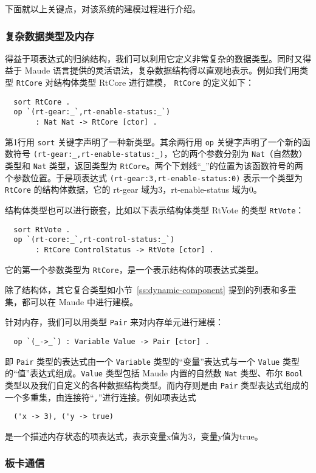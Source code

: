 下面就以上关键点，对该系统的建模过程进行介绍。

\subsubsection{复杂数据类型及内存}

得益于项表达式的归纳结构，我们可以利用它定义非常复杂的数据类型。同时又得益于 Maude 语言提供的灵活语法，复杂数据结构得以直观地表示。例如我们用类型 \verb|RtCore| 对结构体类型 RtCore 进行建模， \verb|RtCore| 的定义如下：
\begin{verbatim}
  sort RtCore .
  op `(rt-gear:_`,rt-enable-status:_`) 
       : Nat Nat -> RtCore [ctor] .
\end{verbatim}
第1行用 \verb|sort| 关键字声明了一种新类型。其余两行用 \verb|op| 关键字声明了一个新的函数符号 \verb|(rt-gear:_,rt-enable-status:_)|，它的两个参数分别为 \verb|Nat|（自然数）类型和 \verb|Nat| 类型，返回类型为 \verb|RtCore|。两个下划线“\verb|_|”的位置为该函数符号的两个参数位置。于是项表达式 \verb|(rt-gear:3,rt-enable-status:0)| 表示一个类型为 \verb|RtCore| 的结构体数据，它的 rt-gear 域为3，rt-enable-status 域为0。

结构体类型也可以进行嵌套，比如以下表示结构体类型 RtVote 的类型 \verb|RtVote|：
\begin{verbatim}
  sort RtVote .
  op `(rt-core:_`,rt-control-status:_`) 
       : RtCore ControlStatus -> RtVote [ctor] .
\end{verbatim}
它的第一个参数类型为 \verb|RtCore|，是一个表示结构体的项表达式类型。

除了结构体，其它复合类型如小节~\ref{ss:dynamic-component} 提到的列表和多重集，都可以在 Maude 中进行建模。

针对内存，我们可以用类型 \verb|Pair| 来对内存单元进行建模：
\begin{verbatim}
  op `(_->_`) : Variable Value -> Pair [ctor] .
\end{verbatim}
即 \verb|Pair| 类型的表达式由一个 \verb|Variable| 类型的“变量”表达式与一个 \verb|Value| 类型的“值”表达式组成。\verb|Value| 类型包括 Maude 内置的自然数 \verb|Nat| 类型、布尔 \verb|Bool| 类型以及我们自定义的各种数据结构类型。而内存则是由 \verb|Pair| 类型表达式组成的一个多重集，由连接符“\verb|,|”进行连接。例如项表达式
\begin{verbatim}
  ('x -> 3), ('y -> true)
\end{verbatim}
是一个描述内存状态的项表达式，表示变量x值为3，变量y值为true。

\subsubsection{板卡通信}

